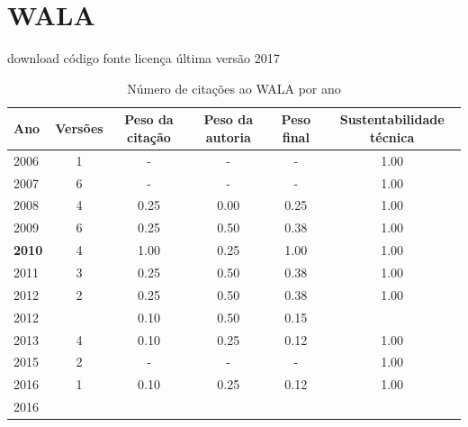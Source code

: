 \section{WALA}
\checkmark download
\checkmark código fonte
\checkmark licença
\checkmark última versão 2017


\begin{table}[H]
\caption{Número de citações ao WALA por ano}
\centering
\begin{tabular}{| l | c | c | c | c | c |}
  \hline
  Ano & Versões & Peso da citação & Peso da autoria & Peso final & Sustentabilidade técnica \\
  \hline
        2006 & 1 & - & - & -
        &
          {\color{blue} 1.00}
        \\
\hline
        2007 & 6 & - & - & -
        &
          {\color{blue} 1.00}
        \\
\hline
            2008
          &
          4
          &
          0.25
          &
          0.00
          &
          0.25
          &
            {\color{blue} 1.00}
          \\
\hline
            2009
          &
          6
          &
          0.25
          &
          0.50
          &
          0.38
          &
            {\color{blue} 1.00}
          \\
\hline
            {\bf 2010}
          &
          4
          &
          1.00
          &
          0.25
          &
          1.00
          &
            {\color{blue} 1.00}
          \\
\hline
            2011
          &
          3
          &
          0.25
          &
          0.50
          &
          0.38
          &
            {\color{blue} 1.00}
          \\
\hline
            2012
          &
          2
          &
          0.25
          &
          0.50
          &
          0.38
          &
            {\color{blue} 1.00}
          \\
            2012
          &
          
          &
          0.10
          &
          0.50
          &
          0.15
          &
          \\
\hline
            2013
          &
          4
          &
          0.10
          &
          0.25
          &
          0.12
          &
            {\color{blue} 1.00}
          \\
\hline
        2015 & 2 & - & - & -
        &
          {\color{blue} 1.00}
        \\
\hline
            2016
          &
          1
          &
          0.10
          &
          0.25
          &
          0.12
          &
            {\color{blue} 1.00}
          \\
            2016
          &
          

\end{tabular}
\end{table}
